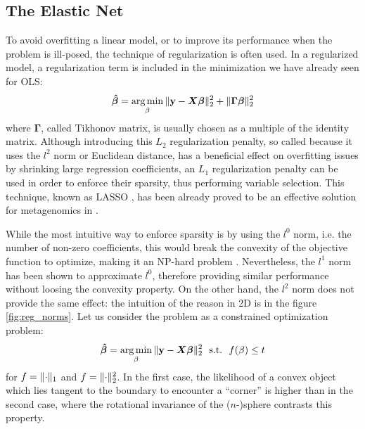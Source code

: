 \subsection{The Elastic Net}

To avoid overfitting a linear model, or to improve its performance when the problem is ill-posed, the technique of regularization is often used. In a regularized model, a regularization term is included in the minimization we have already seen for OLS:
\begin{equation*}
    \boldsymbol{\hat{\beta}} = \operatorname*{arg\,min}_{\beta}{\lVert\mathbf{y} - \boldsymbol{X}\boldsymbol{\beta}\rVert_2^2} + \lVert\boldsymbol{\Gamma}\boldsymbol{\beta}\rVert_2^2
\end{equation*}
where $\boldsymbol{\Gamma}$, called Tikhonov matrix, is usually chosen as a multiple of the identity matrix. Although introducing this $L_2$ regularization penalty, so called because it uses the $l^2$ norm or Euclidean distance, has a beneficial effect on overfitting issues by shrinking large regression coefficients, an $L_1$ regularization penalty can be used in order to enforce their sparsity, thus performing variable selection. This technique, known as LASSO \cite{tibshirani_regression_1996}, has been already proved to be an effective solution for metagenomics in \cite{lindner_metagenomic_2013}.

While the most intuitive way to enforce sparsity is by using the $l^0$ norm, i.e. the number of non-zero coefficients, this would break the convexity of the objective function to optimize, making it an NP-hard problem \cite{donoho_compressed_2006}. Nevertheless, the $l^1$ norm has been shown to approximate $l^0$, therefore providing similar performance without loosing the convexity property.
On the other hand, the $l^2$ norm does not provide the same effect: the intuition of the reason in 2D is in the figure \ref{fig:reg_norms}. Let us consider the problem as a constrained optimization problem:
\begin{equation*}
    \boldsymbol{\hat{\beta}} = \operatorname*{arg\,min}_{\beta}{\lVert\mathbf{y} - \boldsymbol{X}\boldsymbol{\beta}\rVert_2^2}~~\text{s.t.}~~f(\beta) \leq t
\end{equation*}
for $f=\lVert\cdot\rVert_1$ and $f=\lVert\cdot\rVert_2^2$. In the first case, the likelihood of a convex object which lies tangent to the boundary to encounter a ``corner'' is higher than in the second case, where the rotational invariance of the ($n$-)sphere contrasts this property.

